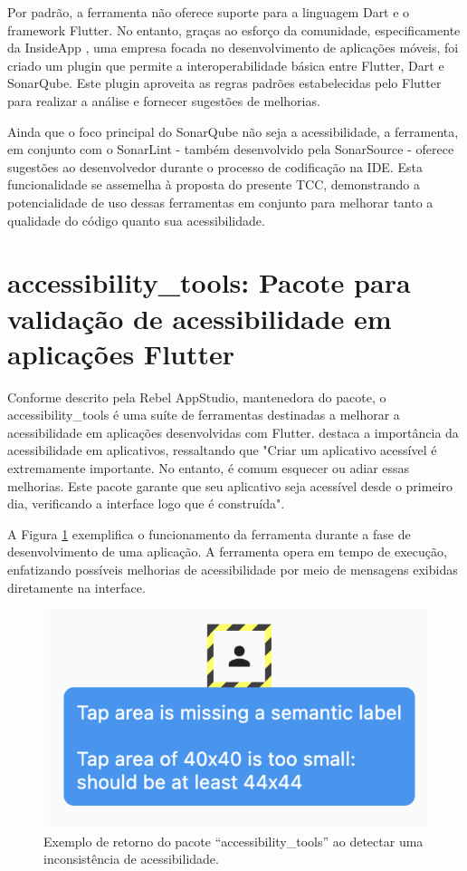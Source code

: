 Por padrão, a ferramenta não oferece suporte para a linguagem Dart e o framework Flutter. No entanto, graças ao esforço da comunidade, especificamente da InsideApp \cite{sonarflutter}, uma empresa focada no desenvolvimento de aplicações móveis, foi criado um plugin que permite a interoperabilidade básica entre Flutter, Dart e SonarQube. Este plugin aproveita as regras padrões estabelecidas pelo Flutter para realizar a análise e fornecer sugestões de melhorias.

Ainda que o foco principal do SonarQube não seja a acessibilidade, a ferramenta, em conjunto com o SonarLint - também desenvolvido pela SonarSource \cite{sonarqube} - oferece sugestões ao desenvolvedor durante o processo de codificação na IDE. Esta funcionalidade se assemelha à proposta do presente TCC, demonstrando a potencialidade de uso dessas ferramentas em conjunto para melhorar tanto a qualidade do código quanto sua acessibilidade.

\section{accessibility\_tools: Pacote para validação de acessibilidade em aplicações Flutter}

Conforme descrito pela Rebel AppStudio, mantenedora do pacote, o accessibility\_tools é uma suíte de ferramentas destinadas a melhorar a acessibilidade em aplicações desenvolvidas com Flutter. \cite{accessibilitytools} destaca a importância da acessibilidade em aplicativos, ressaltando que "Criar um aplicativo acessível é extremamente importante. No entanto, é comum esquecer ou adiar essas melhorias. Este pacote garante que seu aplicativo seja acessível desde o primeiro dia, verificando a interface logo que é construída".

A Figura \ref{fig:accessibilitytools} exemplifica o funcionamento da ferramenta durante a fase de desenvolvimento de uma aplicação. A ferramenta opera em tempo de execução, enfatizando possíveis melhorias de acessibilidade por meio de mensagens exibidas diretamente na interface.

\begin{figure}[!h]
	\centering
	\caption{Exemplo de retorno do pacote “accessibility\_tools” ao detectar uma inconsistência de acessibilidade.}
	\label{fig:accessibilitytools}
	\includegraphics[width=384pt]{Assets/AccessibilityTools.png}
\end{figure}


